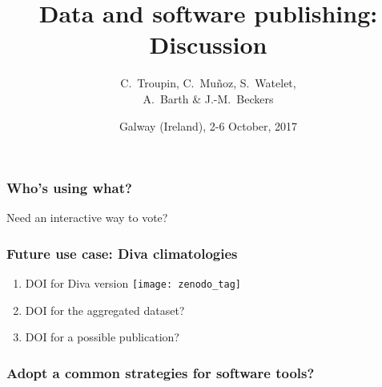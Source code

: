


\title{Data and software publishing:\\
Discussion}
\author[C.~Troupin]{C.~Troupin, C.~Muñoz, S.~Watelet,\\ A.~Barth \& J.-M.~Beckers}
\date{Galway (Ireland), 2-6 October, 2017}
  



\begin{frame}
\maketitle
\end{frame}

\begin{frame}
\frametitle{Who's using what?}

Need an interactive way to vote?

\end{frame}

\begin{frame}
\frametitle{Future use case: Diva climatologies}

\begin{enumerate}
\item DOI for Diva version \hfill \texttt{[image: zenodo\_tag]}
\item DOI for the aggregated dataset? 
\item DOI for a possible publication?
\end{enumerate}

\end{frame}


\begin{frame}
\frametitle{Adopt a common strategies for software tools?}



\end{frame}

